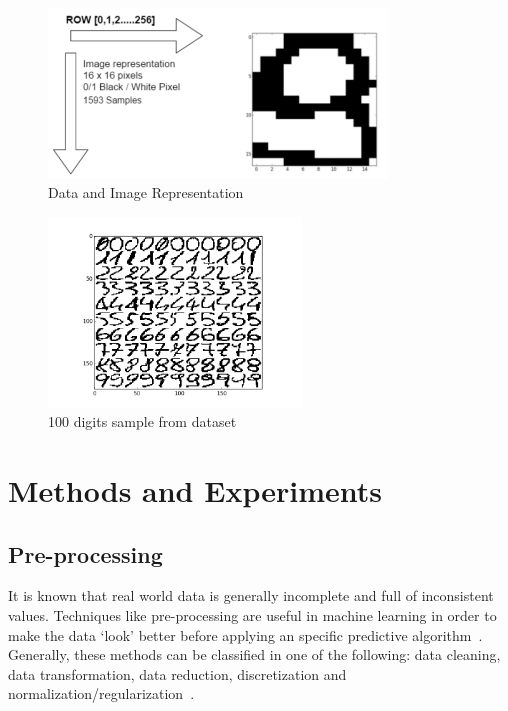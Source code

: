 \documentclass[letterpaper,10pt]{article}
\theoremstyle{mytheor}
\begin{document}
\begin{figure}[H]
\includegraphics[width=0.8\textwidth]{dataset}
\centering
\caption{Data and Image Representation}
\label{fig:1}
\end{figure}

\begin{figure}[H]
\includegraphics[width=0.6\textwidth]{dataset100}
\centering
\caption{100 digits sample from dataset}
\label{fig:1.1}
\end{figure}

\section{Methods and Experiments}

\subsection{Pre-processing}

It is known that real world data is generally incomplete and full of inconsistent values. Techniques like pre-processing are useful in machine learning in order to make the data ‘look’ better before applying an specific predictive algorithm~\cite{bishop2007pattern}. Generally, these methods can be classified in one of the following: data cleaning, data transformation, data reduction, discretization and normalization/regularization~\cite{rajaraman2012mining}.
\end{document}
